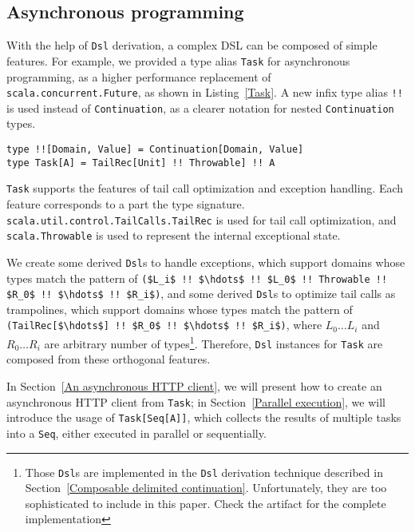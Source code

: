 \subsection{Asynchronous programming}

With the help of \lstinline{Dsl} derivation, a complex DSL can be composed of simple features. For example, we provided a type alias \lstinline{Task} for asynchronous programming, as a higher performance replacement of \lstinline{scala.concurrent.Future}, as shown in Listing~\ref{Task}. A new infix type alias \lstinline{!!} is used instead of \lstinline{Continuation}, as a clearer notation for nested \lstinline{Continuation} types.
\begin{lstlisting}[caption={The definition of asynchronous \lstinline{Task}},label={Task}]
type !![Domain, Value] = Continuation[Domain, Value]
type Task[A] = TailRec[Unit] !! Throwable] !! A
\end{lstlisting}

\lstinline{Task} supports the features of tail call optimization and exception handling. Each feature corresponds to a part the type signature. \lstinline{scala.util.control.TailCalls.TailRec} is used for tail call optimization, and \lstinline{scala.Throwable} is used to represent the internal exceptional state.

We create some derived \lstinline{Dsl}s to handle exceptions, which support domains whose types match the pattern of \lstinline[mathescape=true]{($L_i$ !! $\hdots$ !! $L_0$ !! Throwable !! $R_0$ !! $\hdots$ !! $R_i$)}, and some derived \lstinline{Dsl}s to optimize tail calls as trampolines, which support domains whose types match the pattern of \lstinline[mathescape=true]{(TailRec[$\hdots$] !! $R_0$ !! $\hdots$ !! $R_i$)}, where $L_0 \hdots L_i$ and $R_0 \hdots R_i$ are arbitrary number of types\footnote{Those \lstinline{Dsl}s are implemented in the \lstinline{Dsl} derivation technique described in Section~\ref{Composable delimited continuation}. Unfortunately, they are too sophisticated to include in this paper. Check the artifact for the complete implementation}. Therefore, \lstinline{Dsl} instances for \lstinline{Task} are composed from these orthogonal features.

In Section~\ref{An asynchronous HTTP client}, we will present how to create an asynchronous HTTP client from \lstinline{Task}; in  Section~\ref{Parallel execution}, we will introduce the usage of \lstinline{Task[Seq[A]]}, which collects the results of multiple tasks into a \lstinline{Seq}, either executed in parallel or sequentially.

